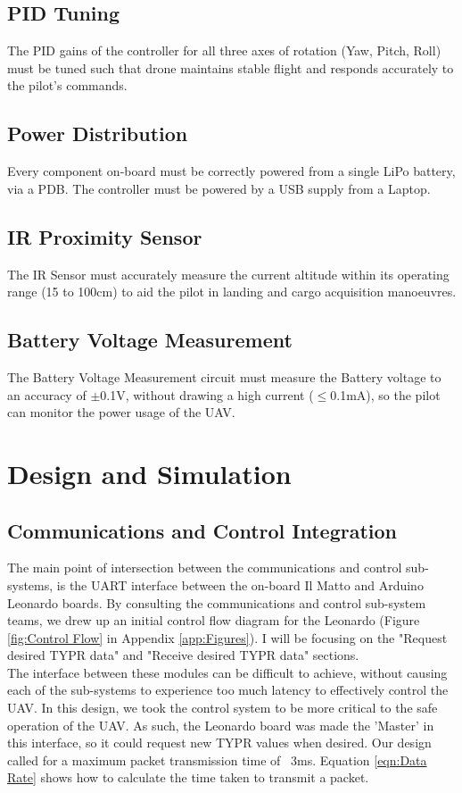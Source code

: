 \documentclass[a4paper,11pt]{article}
\begin{document}
\subsection{PID Tuning}
The PID gains of the controller for all three axes of rotation (Yaw, Pitch, Roll) must be tuned such that drone maintains stable flight and responds accurately to the pilot's commands.
\subsection{Power Distribution}
Every component on-board must be correctly powered from a single LiPo battery, via a PDB. The controller must be powered by a USB supply from a Laptop.
\subsection{IR Proximity Sensor}
The IR Sensor must accurately measure the current altitude within its operating range (15 to 100cm) to aid the pilot in landing and cargo acquisition manoeuvres.
\subsection{Battery Voltage Measurement}
The Battery Voltage Measurement circuit must measure the Battery voltage to an accuracy of $\pm$0.1V, without drawing a high current ($\leq$0.1mA), so the pilot can monitor the power usage of the UAV.

\section{Design and Simulation}
\subsection{Communications and Control Integration}
The main point of intersection between the communications and control sub-systems, is the UART interface between the on-board Il Matto and Arduino Leonardo boards. By consulting the communications and control sub-system teams, we drew up an initial control flow diagram for the Leonardo (Figure \ref{fig:Control Flow} in Appendix \ref{app:Figures}). I will be focusing on the "Request desired TYPR data" and "Receive desired TYPR data" sections.\\ 
The interface between these modules can be difficult to achieve, without causing each of the sub-systems to experience too much latency to effectively control the UAV. In this design, we took the control system to be more critical to the safe operation of the UAV. As such, the Leonardo board was made the 'Master' in this interface, so it could request new TYPR values when desired. Our design called for a maximum packet transmission time of ~3ms. Equation \ref{eqn:Data Rate} shows how to calculate the time taken to transmit a packet. 
\end{document}
